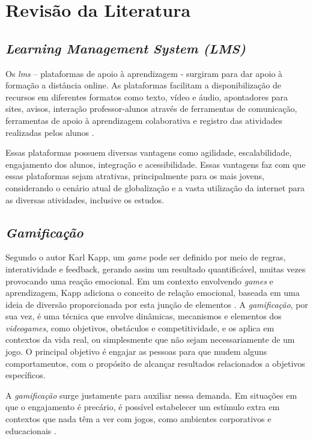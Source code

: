 \chapter{Revisão da Literatura}

\section{\textit{Learning Management System (LMS)}}
Os \textit{\ac{lms}} – plataformas de apoio à aprendizagem - surgiram para dar apoio à formação a distância online. As plataformas facilitam a disponibilização de recursos em diferentes formatos como texto, vídeo e áudio, apontadores para sites, avisos, interação professor-alunos através de ferramentas de comunicação, ferramentas de apoio à aprendizagem colaborativa e registro das atividades realizadas pelos alunos \cite{rentabilizacao-ens-basico-e-secundario:2007}.

Essas plataformas possuem diversas vantagens como agilidade, escalabilidade, engajamento dos alunos, integração e acessibilidade. Essas vantagens faz com que essas plataformas sejam atrativas, principalmente para os mais jovens, considerando o cenário atual de globalização e a vasta utilização da internet para as diversas atividades, inclusive os estudos.


\section{\textit{Gamificação}}
Segundo o autor Karl Kapp, um \textit{game} pode ser definido por meio de regras, interatividade e \gls{feedback}, gerando assim um resultado quantificável, muitas vezes provocando uma reação emocional. Em um contexto envolvendo \textit{games} e aprendizagem, Kapp adiciona o conceito de relação emocional, baseada em uma ideia de diversão proporcionada por esta junção de elementos \cite{gamification-of-learning:2012}.
A \textit{gamificação}, por sua vez, é uma técnica que envolve dinâmicas, mecanismos e elementos dos \textit{videogames}, como objetivos, obstáculos e competitividade, e os aplica em contextos da vida real, ou simplesmente que não sejam necessariamente de um jogo. O principal objetivo é engajar as pessoas para que mudem alguns comportamentos, com o propósito de alcançar resultados relacionados a objetivos específicos.


A \textit{gamificação} surge justamente para auxiliar nessa demanda. Em situações em que o engajamento é precário, é possível estabelecer um estímulo extra em contextos que nada têm a ver com jogos, como ambientes corporativos e educacionais
\cite{gamificacao-corporativa:2017}.



